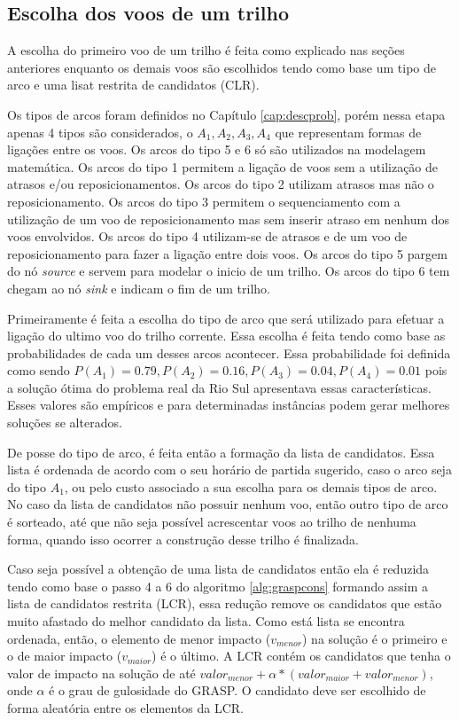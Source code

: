 \subsection{Escolha dos voos de um trilho}

A escolha do primeiro voo de um trilho é feita como explicado nas seções
anteriores enquanto os demais voos são escolhidos tendo como base um tipo de
arco e uma lisat restrita de candidatos (CLR).
 
Os tipos de arcos foram definidos no Capítulo \ref{cap:descprob}, porém nessa
etapa apenas 4 tipos são considerados, o   $A_{1},A_{2},A_{3},A_{4}$ que
representam formas de ligações entre os voos. Os arcos do tipo 5 e 6 só são
utilizados na modelagem matemática. Os arcos do tipo 1 permitem a
ligação de voos sem a utilização de atrasos e/ou reposicionamentos. Os arcos do
tipo 2 utilizam atrasos mas não o reposicionamento. Os arcos do tipo 3 permitem
o sequenciamento com a utilização de um voo de reposicionamento mas sem inserir
atraso em nenhum dos voos envolvidos. Os arcos do tipo 4 utilizam-se de atrasos
e de um voo de reposicionamento para fazer a ligação entre dois voos. Os arcos
do tipo 5 pargem do nó \textit{source} e servem para modelar o inicio de um
trilho. Os arcos do tipo 6 tem chegam ao nó \textit{sink} e indicam o fim de um
trilho.

Primeiramente é feita a escolha do tipo de arco que será utilizado para efetuar
a ligação do ultimo voo do trilho corrente. Essa escolha é feita tendo
como base as probabilidades de cada um desses arcos acontecer. Essa
probabilidade foi definida como sendo
$P(A_{1})=0.79,P(A_{2})=0.16,P(A_{3})=0.04,P(A_{4})=0.01$ pois a solução ótima
do problema real da Rio Sul apresentava essas características. Esses valores
são empíricos e para determinadas instâncias podem gerar melhores soluções se
alterados.

De posse do tipo de arco, é feita então a formação da lista de candidatos. Essa
lista é ordenada de acordo com o seu horário de partida sugerido, caso o arco
seja do tipo $A_{1}$, ou pelo custo associado a sua escolha para os demais
tipos de arco. No caso da lista de candidatos não possuir nenhum voo, então
outro tipo de arco é sorteado, até que não seja possível acrescentar voos ao
trilho de nenhuma forma, quando isso ocorrer a construção
desse trilho é finalizada.
 
Caso seja possível a obtenção de uma lista de candidatos então ela é reduzida
tendo como base o passo 4 a 6 do algoritmo \ref{alg:graspcons} formando assim a
lista de candidatos restrita (LCR), essa redução remove os candidatos que estão
muito afastado do melhor candidato da lista. Como está lista se encontra
ordenada, então, o elemento de menor impacto ($v_{menor}$) na solução é o
primeiro e o de maior impacto ($v_{maior}$) é o último. A LCR contém os
candidatos que tenha o valor de impacto na solução de até $valor_{menor} +
\alpha*(valor_{maior} + valor_{menor})$, onde $\alpha$ é o grau de
gulosidade do GRASP. O candidato deve ser escolhido de forma aleatória entre os
elementos da LCR.
 
